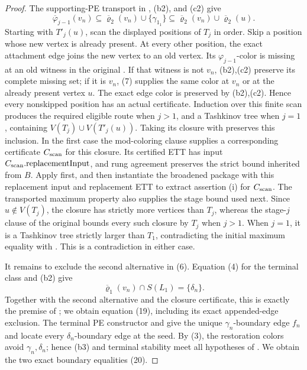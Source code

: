 \begin{proof}
The supporting-PE transport in
, (b2), and (c2) give
\[
 \overline\varphi_{j-1}(v_n)
   \subseteq\overline\varrho_2(v_n)\cup\{\gamma_{1_1}\}
   \subseteq\overline\varrho_2(v_n)\cup\overline\varrho_2(u). \tag{7}
\]
Starting with \(T'_j(u)\), scan the displayed positions of \(T_j\) in
order.  Skip a position whose new vertex is already present.  At every
other position, the exact  attachment edge joins
the new vertex to an old vertex.  Its \(\varphi_{j-1}\)-color is missing
at an old witness in the original
.  If that witness is not \(v_n\),
(b2),(c2) preserve its complete missing set; if it is \(v_n\), (7)
supplies the same color at \(v_n\) or at the already present vertex
\(u\).  The exact edge color is preserved by (b2),(c2).  Hence every
nonskipped position has an actual 
certificate.  Induction over this finite scan produces the required
eligible route when \(j>1\), and a Tashkinov tree when \(j=1\), containing
\(V(T_j)\cup V(T'_j(u))\).  Taking its closure with
 preserves this inclusion.  In the first
case the mod-coloring clause supplies a corresponding certificate
\(C_{\rm scan}\) for this closure.  Its certified ETT has input
\(C_{\rm scan}.\mathrm{replacementInput}\), and rung agreement preserves
the strict bound inherited from \(B\).  Apply
 first, and then instantiate the broadened
package with this replacement input and replacement ETT to extract assertion
(i) for \(C_{\rm scan}\).  The transported maximum property also supplies the
stage bound used next.  Since
\(u\notin V(T_j)\), the closure has strictly more vertices than \(T_j\),
whereas the stage-\(j\) clause of the original
 bounds every such closure by \(T_j\) when
\(j>1\).  When \(j=1\), it is a Tashkinov tree strictly larger than
\(T_1\), contradicting the initial maximum equality with
.  This is a contradiction in either case.

It remains to exclude the second alternative in (6).  Equation (4) for
the terminal class and (b2) give
\[
             \overline\varrho_1(v_n)\cap S(L_1)=\{\delta_n\}.
\]
Together with the second alternative and the closure certificate, this
is exactly the premise of ;
we obtain equation (19), including its exact appended-edge exclusion.
The terminal PE constructor and
 give the unique
\(\gamma_n\)-boundary edge \(f_n\) and locate every
\(\delta_n\)-boundary edge at the seed.  By (3), the restoration colors
avoid \(\gamma_n,\delta_n\); hence (b3) and terminal stability meet all
hypotheses of .  We obtain
the two exact boundary equalities (20).


\end{proof}
